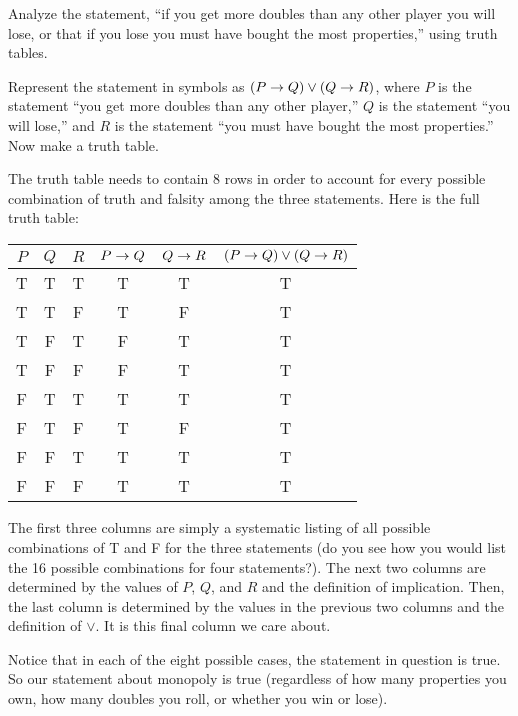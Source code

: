 \documentclass[12pt]{article}
\begin{document}
\begin{example}
  Analyze the statement, ``if you get more doubles than any other player you will lose, or that if you lose you must have bought the most properties,'' using truth tables.
  
  \begin{solution}
    Represent the statement in symbols as $(P \rightarrow Q) \vee (Q \rightarrow R)$, where $P$ is the statement ``you get more doubles than any other player,'' $Q$ is the statement ``you will lose,'' and $R$ is the statement ``you must have bought the most properties.''  Now make a truth table.
    
    The truth table needs to contain 8 rows in order to account for every possible combination of truth and falsity among the three statements.  Here is the full truth table:
    
    \begin{center}
      \begin{tabular}{c|c|c||c|c|c}
        $P$ & $Q$ & $R$ & $P \rightarrow Q$ & $Q \rightarrow R$ & $(P \rightarrow Q) \vee (Q \rightarrow R)$ \\ \hline
        T & T & T & T & T & T \\
        T & T & F & T & F & T \\
        T & F & T & F & T & T \\
        T & F & F & F & T & T \\
        F & T & T & T & T & T \\
        F & T & F & T & F & T \\
        F & F & T & T & T & T \\
        F & F & F & T & T & T
      \end{tabular}
  \end{center}
    The first three columns are simply a systematic listing of all possible combinations of T and F for the three statements (do you see how you would list the 16 possible combinations for four statements?).  The next two columns are determined by the values of $P$, $Q$, and $R$ and the definition of implication.  Then, the last column is determined by the values in the previous two columns and the definition of $\vee$.  It is this final column we care about.
    
    Notice that in each of the eight possible cases, the statement in question is true.  So our statement about monopoly is true (regardless of how many properties you own, how many doubles you roll, or whether you win or lose).
  \end{solution}
\end{example}
\end{document}
